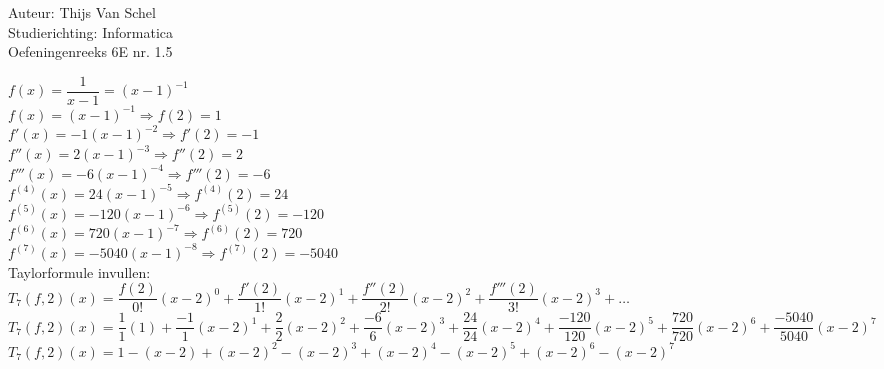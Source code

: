 \documentclass[a4paper]{article}
\begin{document}
  
\noindent \large Auteur: Thijs Van Schel\\
\noindent \large Studierichting: Informatica\\
\noindent \large Oefeningenreeks 6E nr. 1.5\\

\medskip

\normalsize

$f(x) = \dfrac{1}{x-1} = (x-1)^{-1}$\\

$f(x) = (x-1)^{-1} \Rightarrow f(2) = 1$\\

$f'(x) = -1(x-1)^{-2} \Rightarrow f'(2) = -1$\\

$f''(x) = 2(x-1)^{-3} \Rightarrow f''(2) = 2$\\

$f'''(x) = -6(x-1)^{-4} \Rightarrow f'''(2) = -6$\\

$f^{(4)}(x) = 24(x-1)^{-5} \Rightarrow f^{(4)}(2) = 24$\\

$f^{(5)}(x) = -120(x-1)^{-6} \Rightarrow f^{(5)}(2) = -120$\\

$f^{(6)}(x) = 720(x-1)^{-7} \Rightarrow f^{(6)}(2) = 720$\\

$f^{(7)}(x) = -5040(x-1)^{-8} \Rightarrow f^{(7)}(2) = -5040$\\

Taylorformule invullen:\\

$T_7(f, 2)(x) = \dfrac{f(2)}{0!}(x-2)^0 + \dfrac{f'(2)}{1!}(x-2)^1 + \dfrac{f''(2)}{2!}(x-2)^2 + \dfrac{f'''(2)}{3!}(x-2)^3 + \dots$\\

$T_7(f, 2)(x) = \dfrac{1}{1}(1) + \dfrac{-1}{1}(x-2)^1 + \dfrac{2}{2}(x-2)^2 + \dfrac{-6}{6}(x-2)^3 + \dfrac{24}{24}(x-2)^4 + \dfrac{-120}{120}(x-2)^5 + \dfrac{720}{720}(x-2)^6 + \dfrac{-5040}{5040}(x-2)^7$\\

$T_7(f, 2)(x) = 1 - (x-2) + (x-2)^2 - (x-2)^3 + (x-2)^4 - (x-2)^5 + (x-2)^6 - (x-2)^7$\\

\begin{thebibliography}{999}
\end{thebibliography}
\end{document}
